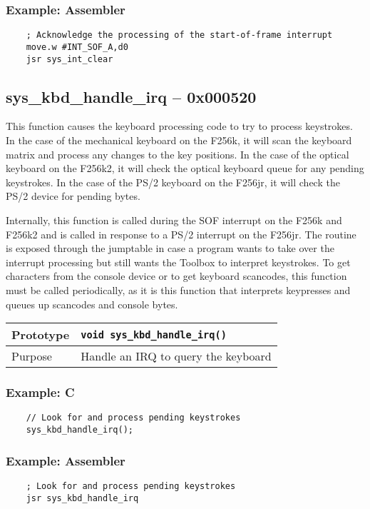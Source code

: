 \subsubsection*{Example: Assembler}
\begin{verbatim}
    ; Acknowledge the processing of the start-of-frame interrupt
    move.w #INT_SOF_A,d0
    jsr sys_int_clear
\end{verbatim}

\subsection*{sys\_kbd\_handle\_irq -- 0x000520}
This function causes the keyboard processing code to try to process keystrokes.
In the case of the mechanical keyboard on the F256k, it will scan the keyboard matrix and process any changes to the key positions.
In the case of the optical keyboard on the F256k2, it will check the optical keyboard queue for any pending keystrokes.
In the case of the PS/2 keyboard on the F256jr, it will check the PS/2 device for pending bytes.

Internally, this function is called during the SOF interrupt on the F256k and F256k2 and is called in response to a PS/2 interrupt on the F256jr. The routine is exposed through the jumptable in case a program wants to take over the interrupt processing but still wants the Toolbox to interpret keystrokes. To get characters from the console device or to get keyboard scancodes, this function must be called periodically, as it is this function that interprets keypresses and queues up scancodes and console bytes.

\bigskip

\begin{table}[!h]\begin{tabular}{|l||l|} \hline
Prototype & \lstinline!void sys_kbd_handle_irq()! \\ \hline
Purpose & Handle an IRQ to query the keyboard \\ \hline
\end{tabular}\end{table}

\subsubsection*{Example: C}
\begin{lstlisting}
    // Look for and process pending keystrokes
    sys_kbd_handle_irq();
\end{lstlisting}

\subsubsection*{Example: Assembler}
\begin{verbatim}
    ; Look for and process pending keystrokes
    jsr sys_kbd_handle_irq
\end{verbatim}